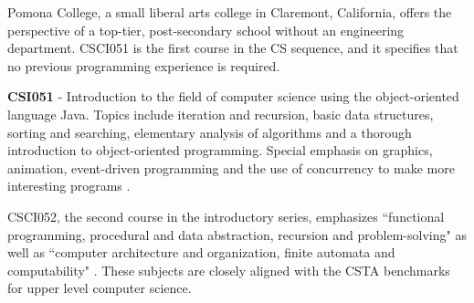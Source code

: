 Pomona College, a small liberal arts college in Claremont, California, offers the perspective of a top-tier, post-secondary school without an engineering department. CSCI051 is the first course in the CS sequence, and it specifies that no previous programming experience is required.
\begin{blockquote}
	\textbf{CSI051} - Introduction to the field of computer science using the object-oriented language Java. Topics include iteration and recursion, basic data structures, sorting and searching, elementary analysis of algorithms and a thorough introduction to object-oriented programming. Special emphasis on graphics, animation, event-driven programming and the use of concurrency to make more interesting programs  \cite{pomonacs1}. 
\end{blockquote}
CSCI052, the second course in the introductory series, emphasizes ``functional programming, procedural and data abstraction, recursion and problem-solving" as well as ``computer architecture and organization, finite automata and computability" \cite{pomonacs1}. These subjects are closely aligned with the CSTA benchmarks for upper level computer science.  \par 

